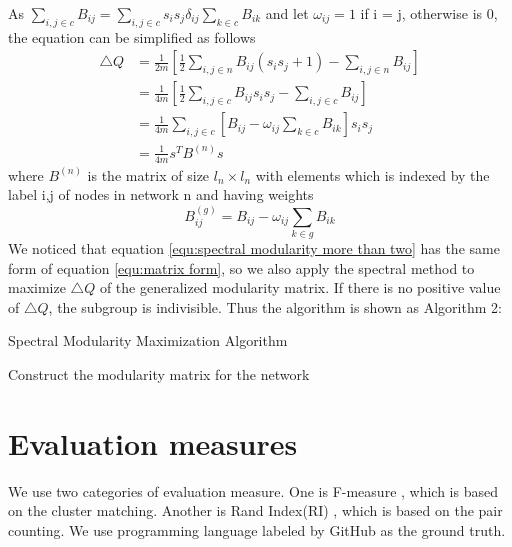 \documentclass[12pt,oneside,final]{vlsithesis}
\begin{document}
As $\sum_{i,j \in c}B_{ij} = \sum_{i,j\in c}s_{i}s_{j}\delta_{ij}\sum_{k\in c}B_{ik}$ and let $\omega_{ij} = 1$ if i = j, otherwise is 0, the equation can be simplified as follows
\begin{equation}
\begin{split}
\bigtriangleup Q & = \frac{1}{2m}[\frac{1}{2}\sum_{i,j \in n}B_{ij}(s_{i}s_{j} + 1) - \sum_{i,j \in n}B_{ij} ] \\
& =  \frac{1}{4m}[\frac{1}{2}\sum_{i,j \in c}B_{ij}s_{i}s_{j} - \sum_{i,j \in c}B_{ij} ]\\
& = \frac{1}{4m}\sum_{i,j \in c}[B_{ij} - \omega_{ij} \sum_{k \in c}B_{ik}]s_{i}s_{j} \\
& = \frac{1}{4m}s^{T}B^{(n)}s
\end{split} 
\label{equ:spectral modularity more than two}
\end{equation}
where  $B^{(n)}$ is the matrix of size $l_{n} \times l_{n}$ with elements which is indexed by the label i,j of nodes in network n and having weights
\begin{equation}
B_{ij}^{(g)} = B_{ij} - \omega_{ij}\sum_{k \in g} B_{ik}
\end{equation}
We noticed that equation \ref{equ:spectral modularity more than two} has the same form of equation \ref{equ:matrix form}, so we also apply the spectral method to maximize $\bigtriangleup Q $ of the generalized modularity matrix. If there is no positive value of $\bigtriangleup Q $, the subgroup is indivisible. Thus the algorithm is shown as Algorithm 2: 
\begin{algorithm}
	\caption{Spectral Modularity Maximization Algorithm}
	Construct the modularity matrix for the network\;
\end{algorithm}
\section{Evaluation measures}
We use two categories of evaluation measure. One is F-measure \cite{wagner2007comparing}, which is based on the cluster matching. Another is Rand Index(RI) \cite{rand1971objective}, which is based on the pair counting. We use programming language labeled by GitHub as the ground truth. 
\end{document}
